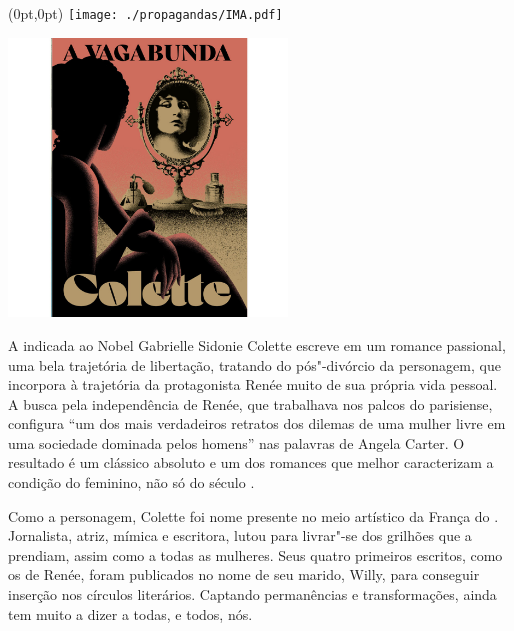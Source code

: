 \pagestyle{ima}
\label{ima}

\begin{textblock*}{5.625in}(0pt,0pt)%
\vspace*{-3.5cm}
\hspace*{-2.77cm}\texttt{[image: ./propagandas/IMA.pdf]}
\end{textblock*}

\pagebreak %

\begin{center}
\hspace*{-3.6cm}
\hspace*{3.1cm}\includegraphics[width=74mm]{./grid/vagabond.jpg}
\end{center}

\hspace*{-7cm}\hrulefill\hspace*{-7cm}

\medskip

\noindent{}A indicada ao Nobel Gabrielle Sidonie Colette escreve em {} um romance passional, uma bela trajetória de libertação, tratando do pós"-divórcio da personagem, que incorpora à trajetória da protagonista Renée muito de sua própria vida pessoal. A busca pela independência de Renée, que trabalhava nos palcos do {} parisiense, configura “um dos mais verdadeiros retratos dos dilemas de uma mulher livre em uma sociedade dominada pelos homens” nas palavras de Angela Carter. O resultado é um clássico absoluto e um dos romances que melhor caracterizam a condição do feminino, não só do século .

Como a personagem, Colette foi nome presente no meio artístico da França do . Jornalista, atriz, mímica e escritora, lutou para livrar"-se dos grilhões que a prendiam, assim como a todas as mulheres. Seus quatro primeiros escritos, como os de Renée, foram publicados no nome de seu marido, Willy, para conseguir inserção nos círculos literários. Captando permanências e transformações, {} ainda tem muito a dizer a todas, e todos, nós.

